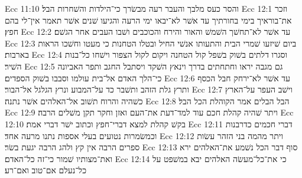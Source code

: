 Ecc 11:10  והסר כעס מלבך והעבר רעה מבשׂרך כי־הילדות והשׁחרות הבל׃
Ecc 12:1  וזכר את־בוראיך בימי בחורתיך עד אשׁר לא־יבאו ימי הרעה והגיעו שׁנים אשׁר תאמר אין־לי בהם חפץ׃
Ecc 12:2  עד אשׁר לא־תחשׁך השׁמשׁ והאור והירח והכוכבים ושׁבו העבים אחר הגשׁם׃
Ecc 12:3  ביום שׁיזעו שׁמרי הבית והתעותו אנשׁי החיל ובטלו הטחנות כי מעטו וחשׁכו הראות בארבות׃
Ecc 12:4  וסגרו דלתים בשׁוק בשׁפל קול הטחנה ויקום לקול הצפור וישׁחו כל־בנות השׁיר׃
Ecc 12:5  גם מגבה יראו וחתחתים בדרך וינאץ השׁקד ויסתבל החגב ותפר האביונה כי־הלך האדם אל־בית עולמו וסבבו בשׁוק הספדים׃
Ecc 12:6  עד אשׁר לא־ירחק חבל הכסף ותרץ גלת הזהב ותשׁבר כד על־המבוע ונרץ הגלגל אל־הבור׃
Ecc 12:7  וישׁב העפר על־הארץ כשׁהיה והרוח תשׁוב אל־האלהים אשׁר נתנה׃
Ecc 12:8  הבל הבלים אמר הקוהלת הכל הבל׃
Ecc 12:9  ויתר שׁהיה קהלת חכם עוד למד־דעת את־העם ואזן וחקר תקן משׁלים הרבה׃
Ecc 12:10  בקשׁ קהלת למצא דברי־חפץ וכתוב ישׁר דברי אמת׃
Ecc 12:11  דברי חכמים כדרבנות וכמשׂמרות נטועים בעלי אספות נתנו מרעה אחד׃
Ecc 12:12  ויתר מהמה בני הזהר עשׂות ספרים הרבה אין קץ ולהג הרבה יגעת בשׂר׃
Ecc 12:13  סוף דבר הכל נשׁמע את־האלהים ירא ואת־מצותיו שׁמור כי־זה כל־האדם׃
Ecc 12:14  כי את־כל־מעשׂה האלהים יבא במשׁפט על כל־נעלם אם־טוב ואם־רע׃


